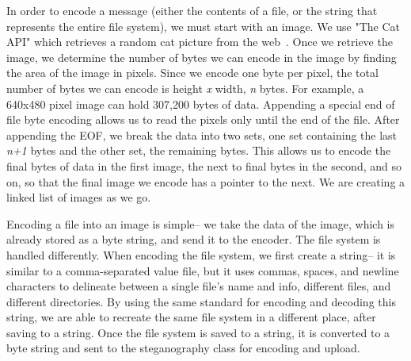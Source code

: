 In order to encode a message (either the contents of a file, or the string that represents the entire file system), we must start with an image. We use "The Cat API" which retrieves a random cat picture from the web~\cite{CatAPIDoc}. Once we retrieve the image, we determine the number of bytes we can encode in the image by finding the area of the image in pixels. Since we encode one byte per pixel, the total number of bytes we can encode is height \textit{x} width, \textit{n} bytes. For example, a 640x480 pixel image can hold 307,200 bytes of data. Appending a special end of file byte encoding allows us to read the pixels only until the end of the file. After appending the EOF, we break the data into two sets, one set containing the last \textit{n+1} bytes and the other set, the remaining bytes. This allows us to encode the final bytes of data in the first image, the next to final bytes in the second, and so on, so that the final image we encode has a pointer to the next. We are creating a linked list of images as we go.

Encoding a file into an image is simple-- we take the data of the image, which is already stored as a byte string, and send it to the encoder. The file system is handled differently. When encoding the file system, we first create a string-- it is similar to a comma-separated value file, but it uses commas, spaces, and newline characters to delineate between a single file's name and info, different files, and different directories. By using the same standard for encoding and decoding this string, we are able to recreate the same file system in a different place, after saving to a string. Once the file system is saved to a string, it is converted to a byte string and sent to the steganography class for encoding and upload.